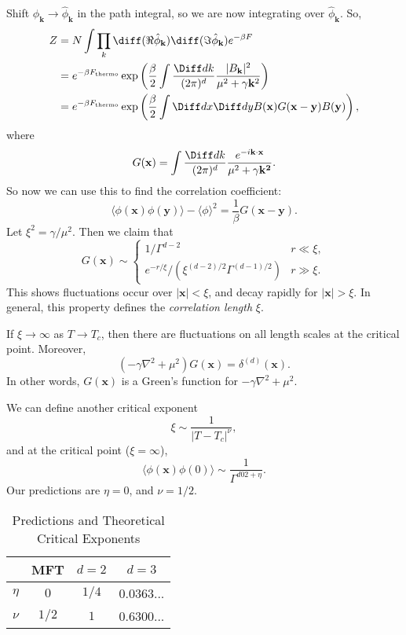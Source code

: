 \documentclass[12pt]{article}
\begin{document}
Shift $\phi_{\mathbf{k}} \to \hat \phi_{\mathbf{k}}$ in the path integral, so we are now integrating over $\hat \phi_{\mathbf{k}}$. So,
\begin{align*}
	Z &= N \int \prod_k \diff (\Re \hat \phi_{\mathbf{k}}) \diff (\Im \hat \phi_{\mathbf{k}}) e^{-\beta F} \\
	  &= e^{-\beta F_{\mathrm{thermo}}} \exp \left( \frac{\beta}{2} \int \frac{\Diff d k}{(2 \pi)^d} \frac{|B_{\mathbf{k}}|^2}{\mu^2 + \gamma \mathbf{k}^2} \right) \\
	  &= e^{-\beta F_{\mathrm{thermo}}} \exp \left( \frac{\beta}{2} \int \Diff d x \Diff d y B(\mathbf{x}) G(\mathbf{x} - \mathbf{y}) B(\mathbf{y}) \right),
\end{align*}
where
\[
G(\mathbf{x}) = \int \frac{\Diff d k}{(2 \pi)^d} \frac{e^{-i \mathbf{k} \cdot \mathbf{x}}}{\mu^2 + \gamma \mathbf{k^2}}.
\]
So now we can use this to find the correlation coefficient:
\[
\langle \phi(\mathbf{x}) \phi(\mathbf{y}) \rangle - \langle \phi \rangle^2 = \frac{1}{\beta} G(\mathbf{x} - \mathbf{y}).
\]
Let $\xi^2 = \gamma/\mu^2$. Then we claim that
\[
G(\mathbf{x}) \sim
\begin{cases}
	1/\Gamma^{d-2} & r \ll \xi,\\
	e^{-r/\xi}/(\xi^{(d-2)/2} \Gamma^{(d-1)/2}) & r \gg \xi.
\end{cases}
\]
This shows fluctuations occur over $|\mathbf{x}| < \xi$, and decay rapidly for $|\mathbf{x}| > \xi$. In general, this property defines the \emph{correlation length} $\xi$.

If $\xi \to \infty$ as $T \to T_c$, then there are fluctuations on all length scales at the critical point. Moreover,
\[
	(- \gamma \nabla^2 + \mu^2) G(\mathbf{x}) = \delta^{(d)}(\mathbf{x}).
\]
In other words, $G(\mathbf{x})$ is a Green's function for $- \gamma \nabla^2 + \mu^2$.

We can define another critical exponent
\[
\xi \sim \frac{1}{|T - T_c|^{\nu}},
\]
and at the critical point ($\xi = \infty$),
\[
\langle \phi(\mathbf{x}) \phi(0) \rangle \sim \frac{1}{\Gamma^{d 02 + \eta}}.
\]
Our predictions are $\eta = 0$, and $\nu = 1/2$.

\begin{table}[ht]
\centering
\begin{tabular}{c|ccc}
	& MFT & $d = 2$ & $d = 3$ \\
\hline
	$\eta$ & $0$ & $1/4$ & 0.0363... \\
	$\nu$ & $1/2$ & $1$ & 0.6300... \\
\end{tabular}
\caption{Predictions and Theoretical Critical Exponents}
\end{table}
\end{document}
